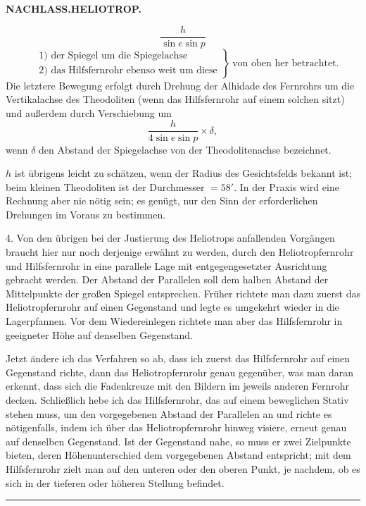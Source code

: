 \clearpage
\noindent{}\hfill{\small\textbf{NACHLASS.\quad HELIOTROP.}}\hfill\null\par
\[
\frac{h}{\sin e\sin p}
\]
\[
\left.\begin{aligned}
&\text{1) der Spiegel um die Spiegelachse}\\
&\text{2) das Hilfsfernrohr ebenso weit um diese}
\end{aligned}\right\}\ \text{von oben her betrachtet.}
\]
Die letztere Bewegung erfolgt durch Drehung der Alhidade des Fernrohrs
um die Vertikalachse des Theodoliten (wenn das Hilfsfernrohr auf einem
solchen sitzt) und außerdem durch Verschiebung um
\[
\frac{h}{4\sin e\sin p}\times\delta,
\]
wenn $\delta$ den Abstand der Spiegelachse von der Theodolitenachse bezeichnet.

$h$ ist übrigens leicht zu schätzen, wenn der Radius des Gesichtsfelds
bekannt ist; beim kleinen Theodoliten ist der Durchmesser $=58'$.
In der Praxis wird eine Rechnung aber nie nötig sein; es genügt, nur den
Sinn der erforderlichen Drehungen im Voraus zu bestimmen.

4. Von den übrigen bei der Justierung des Heliotrops anfallenden Vorgängen
braucht hier nur noch derjenige erwähnt zu werden, durch den Heliotropfernrohr
und Hilfsfernrohr in eine parallele Lage mit entgegengesetzter Ausrichtung
gebracht werden. Der Abstand der Parallelen soll dem halben Abstand der
Mittelpunkte der großen Spiegel entsprechen. Früher richtete man dazu
zuerst das Heliotropfernrohr auf einen Gegenstand und legte es umgekehrt
wieder in die Lagerpfannen. Vor dem Wiedereinlegen richtete man aber das
Hilfsfernrohr in geeigneter Höhe auf denselben Gegenstand.

Jetzt ändere ich das Verfahren so ab, dass ich zuerst das Hilfsfernrohr auf
einen Gegenstand richte, dann das Heliotropfernrohr genau gegenüber, was man
daran erkennt, dass sich die Fadenkreuze mit den Bildern im jeweils anderen
Fernrohr decken. Schließlich hebe ich das Hilfsfernrohr, das auf einem
beweglichen Stativ stehen muss, um den vorgegebenen Abstand der Parallelen
an und richte es nötigenfalls, indem ich über das Heliotropfernrohr hinweg
visiere, erneut genau auf denselben Gegenstand. Ist der Gegenstand nahe, so
muss er zwei Zielpunkte bieten, deren Höhenunterschied dem vorgegebenen
Abstand entspricht; mit dem Hilfsfernrohr zielt man auf den unteren oder
den oberen Punkt, je nachdem, ob es sich in der tieferen oder höheren
Stellung befindet.
\begin{center}\rule{30mm}{.4pt}\end{center}

